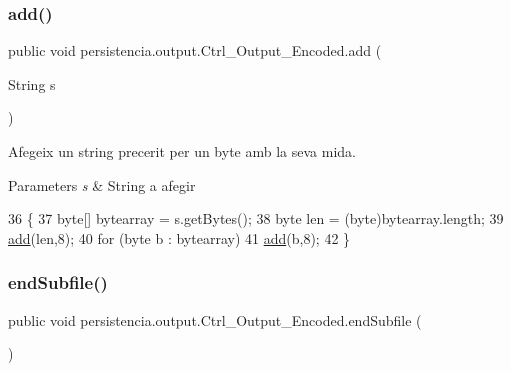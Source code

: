 \subsubsection{\texorpdfstring{add()}{add()}}
{\footnotesize\ttfamily public void persistencia.\+output.\+Ctrl\+\_\+\+Output\+\_\+\+Encoded.\+add (\begin{DoxyParamCaption}\item[{String}]{s }\end{DoxyParamCaption})\hspace{0.3cm}{\ttfamily [inline]}}



Afegeix un string precerit per un byte amb la seva mida. 


\begin{DoxyParams}{Parameters}
{\em s} & String a afegir \\
\hline
\end{DoxyParams}

\begin{DoxyCode}
36                               \{
37         byte[] bytearray = s.getBytes();
38         byte len = (byte)bytearray.length;
39         \hyperlink{classpersistencia_1_1output_1_1Ctrl__Output__Encoded_a840c4e8c37c76677a0c4f5739649291d}{add}(len,8);
40         \textcolor{keywordflow}{for} (byte b : bytearray) 
41            \hyperlink{classpersistencia_1_1output_1_1Ctrl__Output__Encoded_a840c4e8c37c76677a0c4f5739649291d}{add}(b,8);
42     \}
\end{DoxyCode}
\mbox{\label{classpersistencia_1_1output_1_1Ctrl__Output__Encoded_a3864fa867e7533f3d0d82b8f6513dae1}} 
\subsubsection{\texorpdfstring{end\+Subfile()}{endSubfile()}}
{\footnotesize\ttfamily public void persistencia.\+output.\+Ctrl\+\_\+\+Output\+\_\+\+Encoded.\+end\+Subfile (\begin{DoxyParamCaption}{ }\end{DoxyParamCaption})\hspace{0.3cm}{\ttfamily [inline]}}



